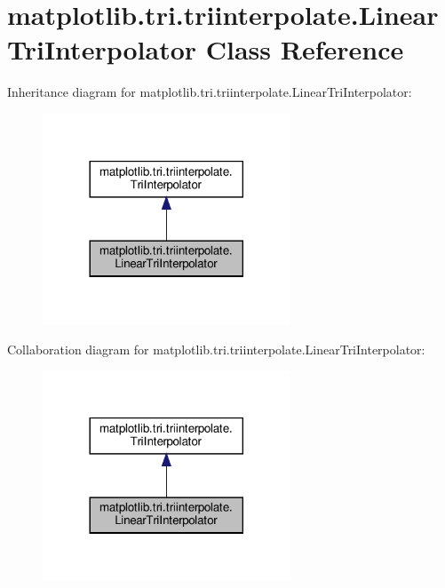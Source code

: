 \hypertarget{classmatplotlib_1_1tri_1_1triinterpolate_1_1LinearTriInterpolator}{}\section{matplotlib.\+tri.\+triinterpolate.\+Linear\+Tri\+Interpolator Class Reference}
\label{classmatplotlib_1_1tri_1_1triinterpolate_1_1LinearTriInterpolator}


Inheritance diagram for matplotlib.\+tri.\+triinterpolate.\+Linear\+Tri\+Interpolator\+:
\nopagebreak
\begin{figure}[H]
\begin{center}
\leavevmode
\includegraphics[width=209pt]{classmatplotlib_1_1tri_1_1triinterpolate_1_1LinearTriInterpolator__inherit__graph}
\end{center}
\end{figure}


Collaboration diagram for matplotlib.\+tri.\+triinterpolate.\+Linear\+Tri\+Interpolator\+:
\nopagebreak
\begin{figure}[H]
\begin{center}
\leavevmode
\includegraphics[width=209pt]{classmatplotlib_1_1tri_1_1triinterpolate_1_1LinearTriInterpolator__coll__graph}
\end{center}
\end{figure}
